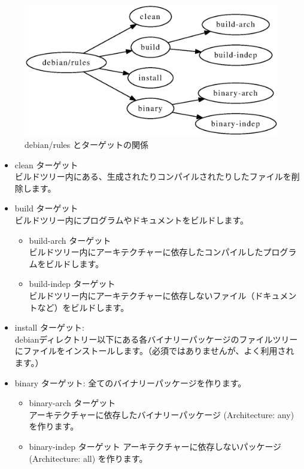 \documentclass[mingoth,a4paper]{jsarticle}
\begin{document}
\begin{figure}[h]
\begin{center}
\includegraphics[width=1.0\hsize]{image201302/rules.eps}
\end{center}
\caption{debian/rules とターゲットの関係}
\label{fig:debian_rules_targets}
\end{figure}

\begin{itemize}
\item clean ターゲット\\
ビルドツリー内にある、生成されたりコンパイルされたりしたファイルを削除します。

\item build ターゲット\\
ビルドツリー内にプログラムやドキュメントをビルドします。

\begin{itemize}
\item build-arch ターゲット\\
ビルドツリー内にアーキテクチャーに依存したコンパイルしたプログラムをビルドします。

\item build-indep ターゲット\\
ビルドツリー内にアーキテクチャーに依存しないファイル（ドキュメントなど）をビルドします。
\end{itemize}

\item install ターゲット: \\
debianディレクトリー以下にある各バイナリーパッケージのファイルツリーにファイルをインストールします。（必須ではありませんが、よく利用されます。）

\item binary ターゲット: 全てのバイナリーパッケージを作ります。
\begin{itemize}
\item binary-arch ターゲット\\
アーキテクチャーに依存したバイナリーパッケージ (Architecture: any)を作ります。

\item binary-indep ターゲット
アーキテクチャーに依存しないパッケージ (Architecture: all) を作ります。
\end{itemize}
\end{itemize}
\end{document}
